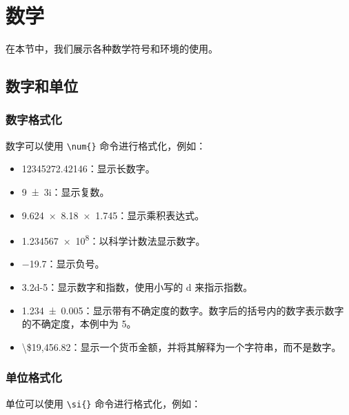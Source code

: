 \section{数学}\label{sec:math}

在本节中，我们展示各种数学符号和环境的使用。

\subsection{数字和单位}

\subsubsection*{数字格式化}

数字可以使用 \verb|\num{}| 命令进行格式化，例如：

\begin{itemize}
  \item \num{12345272.42146}：显示长数字。
  \item \num{9+-3i}：显示复数。
  \item \num{9.624 x 8.18 x 1.745}：显示乘积表达式。
  \item \num{1.234567e8}：以科学计数法显示数字。
  \item \num{-19.7}：显示负号。
  \item \num{3.2d-5}：显示数字和指数，使用小写的 d 来指示指数。
  \item \num{1.234(5)}：显示带有不确定度的数字。数字后的括号内的数字表示数字的不确定度，本例中为 5。
  \item \num[parse-numbers=false]{\$19,456.82}：显示一个货币金额，并将其解释为一个字符串，而不是数字。
\end{itemize}

\subsubsection*{单位格式化}

单位可以使用 \verb|\si{}| 命令进行格式化，例如：

